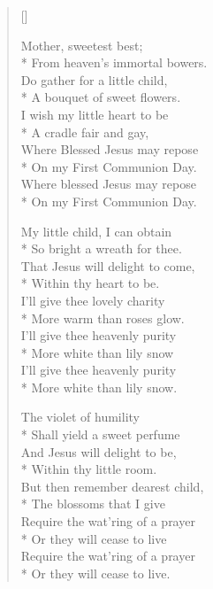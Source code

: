 \newHymn
{}

\begin{verse}[\versewidth]

\begin{altverse}
 Mother, sweetest best;\\*
From heaven's immortal bowers.\\
 Do gather for a little child,\\*
 A bouquet of sweet flowers. \\
 I  wish my little heart to be\\*
 A cradle fair and gay, \\
 Where
Blessed Jesus may repose\\* 
 On my First Communion Day.\\
 Where blessed Jesus may repose\\*
 On my First Communion Day.
\end{altverse}

\begin{altverse}
My little child, I can obtain\\*
 So bright a wreath for
thee. \\
 That Jesus will delight to come,\\*
 Within thy heart to be.\\
 I'll give thee lovely charity\\*
 More warm than roses glow.\\
 I'll give thee heavenly purity\\*
 More white than lily snow\\
 I'll give thee heavenly purity\\*
 More white than lily snow.
\end{altverse}

\begin{altverse}
  The violet of humility\\*
 Shall yield a sweet perfume\\
 And Jesus will delight to be,\\*
 Within thy little room.\\
 But then remember dearest child,\\*
 The blossoms that I give\\
 Require the wat'ring of a prayer\\*
 Or they will cease to live \\
 Require the wat'ring of a prayer\\*
 Or they will cease to live.
\end{altverse}
 

\end{verse}
